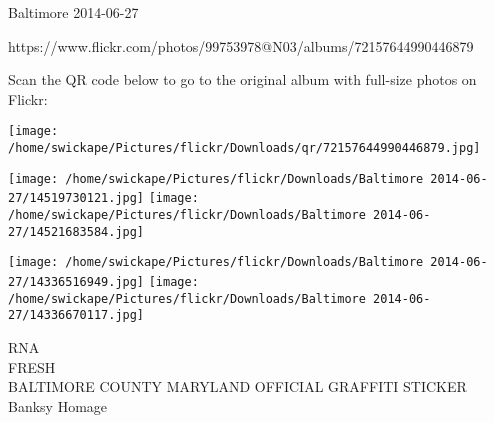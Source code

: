 \documentclass[10pt,letterpaper]{article}
\begin{document}
Baltimore 2014-06-27

https://www.flickr.com/photos/99753978@N03/albums/72157644990446879

Scan the QR code below to go to the original album with full-size photos on Flickr:

\texttt{[image: /home/swickape/Pictures/flickr/Downloads/qr/72157644990446879.jpg]}
\pagebreak

\texttt{[image: /home/swickape/Pictures/flickr/Downloads/Baltimore 2014-06-27/14519730121.jpg]}
\texttt{[image: /home/swickape/Pictures/flickr/Downloads/Baltimore 2014-06-27/14521683584.jpg]}

\texttt{[image: /home/swickape/Pictures/flickr/Downloads/Baltimore 2014-06-27/14336516949.jpg]}
\texttt{[image: /home/swickape/Pictures/flickr/Downloads/Baltimore 2014-06-27/14336670117.jpg]}

RNA\\
FRESH\\
BALTIMORE COUNTY MARYLAND OFFICIAL GRAFFITI STICKER\\
Banksy Homage
\pagebreak
\end{document}
